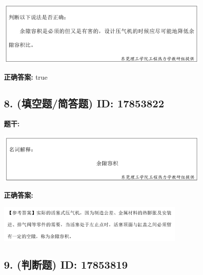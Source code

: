 \documentclass[12pt]{article}
\begin{document}
\begin{center}\includegraphics[width=0.8\textwidth, height=0.25\textheight, keepaspectratio]{question_7_17853821/title_img_1.png}\end{center}

\textbf{正确答案:}
true

\vspace{0.5em}\hrulefill\vspace{1em}

\subsection*{8. (填空题/简答题) \small ID: 17853822}

\textbf{题干:}


\begin{center}\includegraphics[width=0.8\textwidth, height=0.25\textheight, keepaspectratio]{question_8_17853822/title_img_1.png}\end{center}

\textbf{正确答案:}

\begin{center}\includegraphics[width=0.7\textwidth, height=0.2\textheight, keepaspectratio]{question_8_17853822/correct_answer_1_img_1.png}\end{center}

\vspace{0.5em}\hrulefill\vspace{1em}

\subsection*{9. (判断题) \small ID: 17853819}
\end{document}
